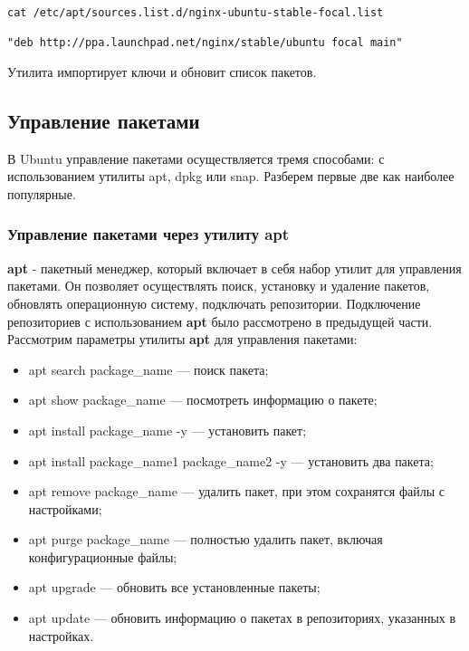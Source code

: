 \documentclass[14pt, a4paper]{article}
\begin{document}
\vspace{0.3cm}
\begin{lstlisting}
cat /etc/apt/sources.list.d/nginx-ubuntu-stable-focal.list

"deb http://ppa.launchpad.net/nginx/stable/ubuntu focal main"
\end{lstlisting}
\vspace{0.2cm}

Утилита импортирует ключи и обновит список пакетов.

\subsection*{Управление пакетами} 

В Ubuntu управление пакетами осуществляется тремя способами: с использованием утилиты apt, dpkg
или snap. Разберем первые две как наиболее популярные.

\newpage

\subsubsection*{Управление пакетами через утилиту apt} 

\textbf{apt} - пакетный менеджер, который включает в себя набор утилит для управления пакетами. Он
позволяет осуществлять поиск, установку и удаление пакетов, обновлять операционную систему,
подключать репозитории. Подключение репозиториев с использованием \textbf{apt} было рассмотрено в
предыдущей части. Рассмотрим параметры утилиты \textbf{apt} для управления пакетами:

\begin{itemize}
    \item \colorbox{backcolour}{apt search package\_name} — поиск пакета;
    \item \colorbox{backcolour}{apt show package\_name} — посмотреть информацию о пакете;
    \item \colorbox{backcolour}{apt install package\_name -y} — установить пакет;
    \item \colorbox{backcolour}{apt install package\_name1 package\_name2 -y} — установить два пакета;
    \item \colorbox{backcolour}{apt remove package\_name} — удалить пакет, при этом сохранятся файлы с настройками;
    \item \colorbox{backcolour}{apt purge package\_name} — полностью удалить пакет, включая конфигурационные файлы;
    \item \colorbox{backcolour}{apt upgrade} — обновить все установленные пакеты;
    \item \colorbox{backcolour}{apt update} — обновить информацию о пакетах в репозиториях, указанных в настройках.
\end{itemize}
\end{document}
